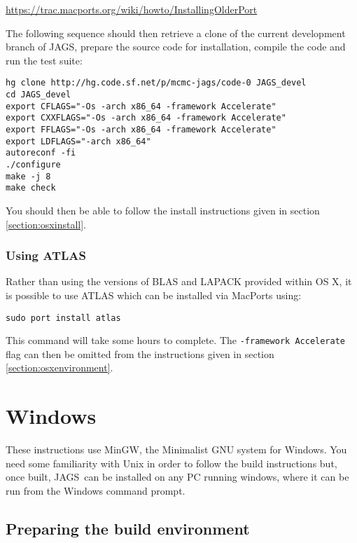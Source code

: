\documentclass[11pt, a4paper, titlepage]{article}
\newcommand{\JAGS}{\textsf{JAGS}}
\begin{document}
 \url{https://trac.macports.org/wiki/howto/InstallingOlderPort}

The following sequence should then retrieve a clone of the current
development branch of \JAGS, prepare the source code for
installation, compile the code and run the test suite:

\begin{verbatim} 
hg clone http://hg.code.sf.net/p/mcmc-jags/code-0 JAGS_devel
cd JAGS_devel
export CFLAGS="-Os -arch x86_64 -framework Accelerate"
export CXXFLAGS="-Os -arch x86_64 -framework Accelerate"
export FFLAGS="-Os -arch x86_64 -framework Accelerate"
export LDFLAGS="-arch x86_64"
autoreconf -fi
./configure
make -j 8
make check
\end{verbatim}

You should then be able to follow the install instructions given in section \ref{section:osxinstall}.

\subsubsection{Using ATLAS}

Rather than using the versions of BLAS and LAPACK provided within OS X, it
is possible to use ATLAS which can be installed via MacPorts using:

\begin{verbatim}
sudo port install atlas
\end{verbatim}

This command will take some hours to complete.  The \texttt{-framework Accelerate} flag can
then be omitted from the instructions given in section \ref{section:osxenvironment}.



\clearpage
\section{Windows}
\label{section:windows}

These instructions use MinGW, the Minimalist GNU system for Windows.
You need some familiarity with Unix in order to follow the build
instructions but, once built, \JAGS\ can be installed on any PC
running windows, where it can be run from the Windows command prompt.

\subsection{Preparing the build environment}
\end{document}
